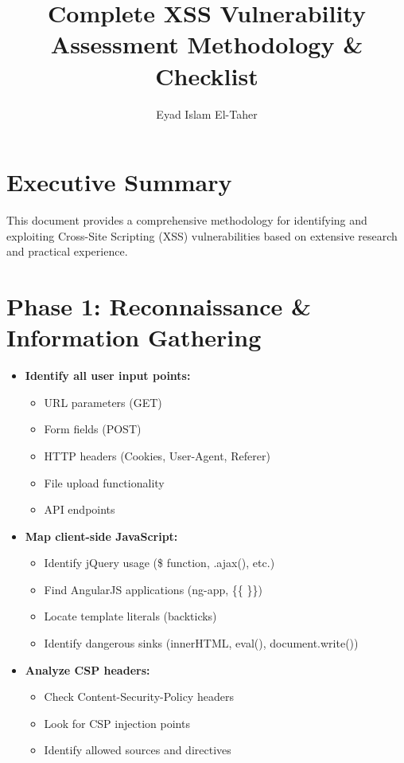 \documentclass[12pt]{article}
\title{\textbf{Complete XSS Vulnerability Assessment Methodology \& Checklist}}
\author{Eyad Islam El-Taher}
\date{}
\begin{document}
\maketitle

\section*{Executive Summary}
This document provides a comprehensive methodology for identifying and exploiting Cross-Site Scripting (XSS) vulnerabilities based on extensive research and practical experience.

\section{Phase 1: Reconnaissance \& Information Gathering}

\begin{tcolorbox}[title={\textbf{1.1 Application Mapping}}, colback=lightblue]
\begin{itemize}[leftmargin=*]
    \item \textbf{Identify all user input points:}
    \begin{itemize}
        \item URL parameters (GET)
        \item Form fields (POST) 
        \item HTTP headers (Cookies, User-Agent, Referer)
        \item File upload functionality
        \item API endpoints
    \end{itemize}
    
    \item \textbf{Map client-side JavaScript:}
    \begin{itemize}
        \item Identify jQuery usage (\$ function, .ajax(), etc.)
        \item Find AngularJS applications (ng-app, \{\{ \}\})
        \item Locate template literals (backticks)
        \item Identify dangerous sinks (innerHTML, eval(), document.write())
    \end{itemize}
    
    \item \textbf{Analyze CSP headers:}
    \begin{itemize}
        \item Check Content-Security-Policy headers
        \item Look for CSP injection points
        \item Identify allowed sources and directives
    \end{itemize}
\end{itemize}
\end{tcolorbox}
\end{document}
